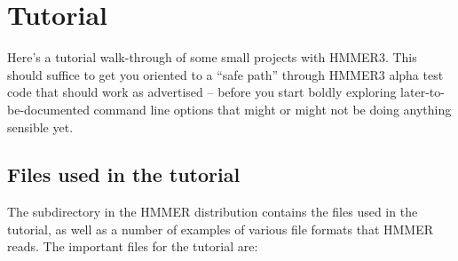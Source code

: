
\section{Tutorial}
\label{section:tutorial}
\setcounter{footnote}{0}

Here's a tutorial walk-through of some small projects with
HMMER3. This should suffice to get you oriented to a ``safe path''
through HMMER3 alpha test code that should work as advertised -- before
you start boldly exploring later-to-be-documented command line options
that might or might not be doing anything sensible yet.


\subsection{Files used in the tutorial}

The subdirectory  in the HMMER distribution contains the
files used in the tutorial, as well as a number of examples of various
file formats that HMMER reads. The important files for the tutorial
are:


